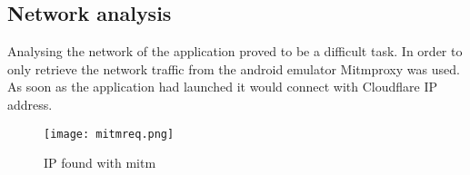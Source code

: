 \subsection{Network analysis}

Analysing the network of the application proved to be a difficult task. 
In order to only retrieve the network traffic from the android emulator Mitmproxy was used.
As soon as the application had launched it would connect with Cloudflare IP address.

\begin{figure}[H]
    \texttt{[image: mitmreq.png]}
    \caption{IP found with mitm}
    \label{tim-appbehavior}
\end{figure}
